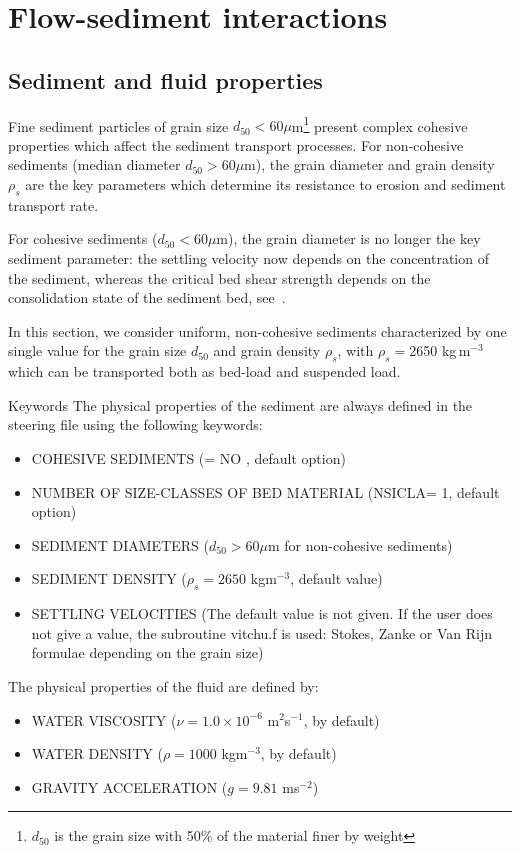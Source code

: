 \section{Flow-sediment interactions}\label{sec:interactions}
\subsection{Sediment and fluid properties}
Fine sediment particles of grain size $d_{50} < 60\mu$m\footnote{$d_{50}$ is the grain size with 50\% of the material finer by weight} present complex
cohesive properties which affect the sediment transport processes. For non-cohesive sediments (median diameter $d_{50} >60 \mu$m), the grain diameter and grain density $\rho_s$ are the key parameters which determine its resistance to erosion and sediment transport rate.

For cohesive sediments ($d_{50} < 60 \mu$m), the grain diameter is
no longer the key sediment parameter: the settling velocity now depends on
the concentration of the sediment, whereas the critical bed shear strength depends on the
consolidation state of the sediment bed, see~\cite{}.

In this section, we consider uniform, non-cohesive sediments characterized by one single value for the grain size $d_{50}$ and grain density $\rho_s$, with $\rho_s=$2650 kg\,m$^{-3}$ which can be transported both as bed-load and suspended load.

\medskip
\begin{bclogo}[couleur=blue!10,arrondi=0.1, logo=\bcinfo]{Keywords}
The physical properties of the sediment are always defined in the \sisyphe steering file using the following keywords:
\begin{itemize}
\item {\ttfamily COHESIVE SEDIMENTS} ({\ttfamily = NO} , default option)
\item {\ttfamily NUMBER OF SIZE-CLASSES OF BED MATERIAL} ({\ttfamily NSICLA=
1}, default option) 
\item {\ttfamily SEDIMENT DIAMETERS} ($d_{50} > 60\mu$m for non-cohesive sediments)
\item {\ttfamily SEDIMENT DENSITY} ($\rho_s = 2650$ kgm$^{-3}$, default value)
\item {\ttfamily SETTLING VELOCITIES} (The default value is not given. If the user does not
give a value, the subroutine {\ttfamily vitchu.f} is used:
Stokes, Zanke or Van Rijn formulae depending on the grain size)
\end{itemize}
The physical properties of the fluid are defined by:
\begin{itemize}
\item {\ttfamily WATER VISCOSITY} ($\nu= 1.0\times 10^{-6}$ m$^2$s$^{-1}$, by default)
\item {\ttfamily WATER DENSITY} ($\rho=1000$ kgm$^{-3}$, by default)
\item {\ttfamily GRAVITY ACCELERATION} ($g=9.81$ ms$^{-2}$)
\end{itemize}
\end{bclogo}

